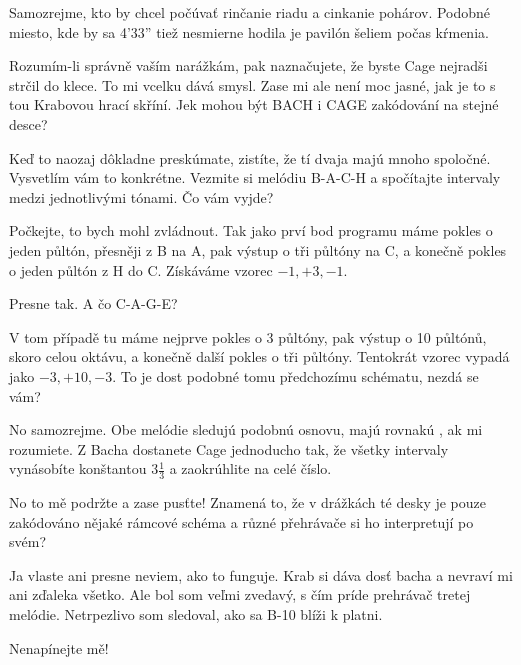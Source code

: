 \documentclass[12pt]{article}
\begin{document}
\begin{description}[itemsep=0pt]
\item[Ž:] Samozrejme, kto by chcel počúvať rinčanie riadu a cinkanie pohárov. Podobné 
    miesto, kde by sa 4'33'' tiež nesmierne hodila je pavilón šeliem počas kŕmenia.

\item[A:] Rozumím-li správně vaším narážkám, pak naznačujete, že byste Cage nejradši
    strčil do klece. To mi vcelku dává smysl. Zase mi ale není moc jasné, jak je
    to s tou Krabovou hrací skříní. Jek mohou být BACH i CAGE zakódování na stejné
    desce?

\item[Ž:] Keď to naozaj dôkladne preskúmate, zistíte, že tí dvaja majú mnoho spoločné. 
    Vysvetlím vám to konkrétne. Vezmite si melódiu B-A-C-H a spočítajte intervaly medzi 
    jednotlivými tónami. Čo vám vyjde?

\item[A:] Počkejte, to bych mohl zvládnout. Tak jako prví bod programu
    máme pokles o jeden půltón, přesněji z B na A, pak výstup o tři půltóny
    na C, a konečně pokles o jeden půltón z H do C. Získáváme vzorec $-1, +3, -1$.

\item[Ž:] Presne tak. A čo C-A-G-E?

\item[A:] V tom případě tu máme nejprve pokles o 3 půltóny, pak výstup o
    10 půltónů, skoro celou oktávu, a konečně další pokles o tři půltóny.
    Tentokrát vzorec vypadá jako $-3, +10, -3$. To je dost podobné
    tomu předchozímu schématu, nezdá se vám?

\item[Ž:] No samozrejme. Obe melódie sledujú podobnú osnovu, majú rovnakú 
    , ak mi rozumiete. Z Bacha dostanete Cage jednoducho tak, 
    že všetky intervaly vynásobíte konštantou $3\frac{1}{3}$ a zaokrúhlite 
    na celé číslo.

\item[A:] No to mě podržte a zase pusťte! Znamená to, že v drážkách té desky
    je pouze zakódováno nějaké rámcové schéma a různé přehrávače si ho interpretují
    po svém?

\item[Ž:] Ja vlaste ani presne neviem, ako to funguje. Krab si dáva dosť bacha 
    a nevraví mi ani zďaleka všetko. Ale bol som veľmi zvedavý, s čím príde 
    prehrávač tretej melódie. Netrpezlivo som sledoval, ako sa B-10 blíži k platni.

\item[A:] Nenapínejte mě!


\end{description}
\end{document}
